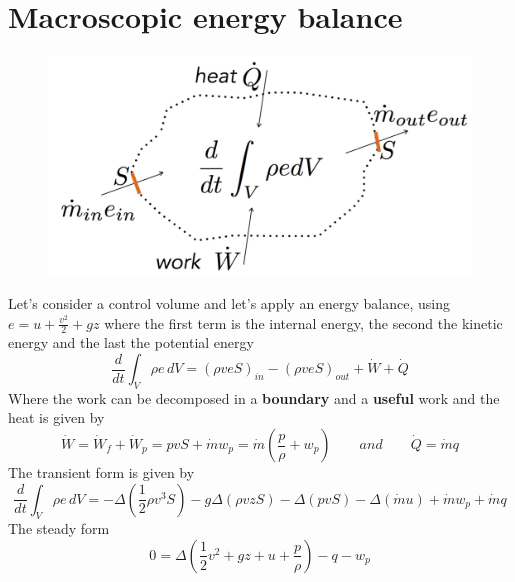 \section{Macroscopic energy balance}
	\begin{figure}
	\vspace{-5mm}
	\includegraphics[scale=0.25]{ch5/2}
	\end{figure}	
	Let's consider a control volume and let's apply an energy balance, using $e = u + \frac{v^2}{2} + gz$ where the first term is the internal energy, the second the kinetic energy and the last the potential energy 
	\begin{equation}
		\frac{d}{dt}\int _V \rho e \, dV = (\rho v e S)_{in} - (\rho v e S)_{out} + \dot{W} + \dot{Q}
	\end{equation}
	Where the work can be decomposed in a \textbf{boundary} and a \textbf{useful} work and the heat is given by
	\begin{equation}
		\dot{W} = \dot{W}_f + \dot{W}_p = pvS + \dot{m}w_p = \dot{m}\left( \frac{p}{\rho}+w_p \right) \qquad and \qquad \dot{Q} = \dot{m} q
	\end{equation}		 
	The transient form is given by 
	\begin{equation}
		\frac{d}{dt}\int _V \rho e \, dV = - \Delta (\frac{1}{2}\rho v^3S) - g \Delta (\rho v z S) - \Delta (pvS) - \Delta (\dot{m}u) + \dot{m}w_p + \dot{m}q
	\end{equation}
	The steady form 
	\begin{equation}
		0 = \Delta \left( \frac{1}{2}v^2 + gz + u + \frac{p}{\rho} \right) - q - w_p 
		\label{eq:5.4}
	\end{equation}
	
